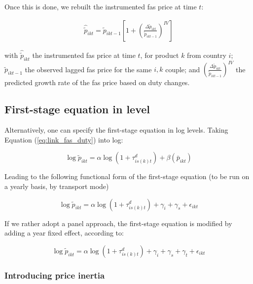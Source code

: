 \documentclass[11pt,twoside, authoryear]{elsarticle}
\begin{document}
Once this is done, we rebuilt the instrumented fas price at time $t$:

\begin{eqnarray*}
\widehat{\widetilde{p}}_{ikt} = \widetilde{p}_{ikt-1}\left[1 + \left(\frac{\Delta \widetilde{p}_{ikt}}{\widetilde{p}_{ikt-1}}\right)^{IV}\right]
\end{eqnarray*}

with $\widehat{\widetilde{p}}_{ikt}$ the instrumented fas price at time $t$, for product $k$ from country $i$; $\widetilde{p}_{ikt-1}$ the observed lagged fas price for the same $i,k$ couple; and $ \left(\frac{\Delta \widetilde{p}_{ikt}}{\widetilde{p}_{ikt-1}}\right)^{IV}$ the predicted growth rate of the fas price based on duty changes.

\subsection{First-stage equation in level}

Alternatively, one can specify the first-stage equation in log levels. Taking Equation (\ref{eq:link_fas_duty}) into log:

$$\log \widetilde{p}_{ikt} =\alpha \log (1+\tau^d_{is(k)t}) + \beta \left(\bar{p}_{ikt}\right) $$

Leading to the following functional form of the first-stage equation (to be run on a yearly basis, by transport mode)

\begin{equation}
\log \widetilde{p}_{ikt} =\alpha \log (1+\tau^d_{is(k)t}) + \gamma_i +\gamma_s +\epsilon_{ikt}  \label{eq:FS_loglevel_cross_section}
\end{equation}

If we rather adopt a panel approach, the first-stage equation is modified by adding a year fixed effect, according to:

\begin{equation}
\log \widetilde{p}_{ikt} =\alpha \log (1+\tau^d_{is(k)t}) + \gamma_i +\gamma_s +\gamma_t +\epsilon_{ikt}  \label{eq:FS_loglevel_panel}
\end{equation}

\subsubsection{Introducing price inertia}
\end{document}
